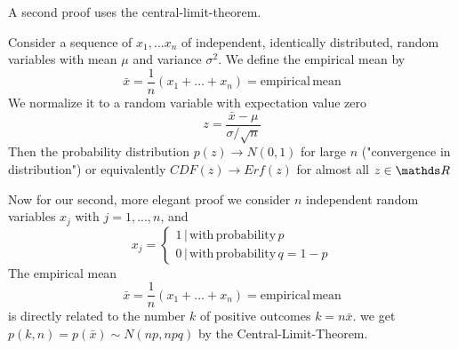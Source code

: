 \documentclass{/home/ben/Templates/notebook}
\begin{document}
	A second proof uses the central-limit-theorem.
	
	\begin{theorem}
		Consider a sequence of $x_1, ... x_n$ of independent, identically distributed, random variables with mean $\mu$ and variance $\sigma^2$. We define the empirical mean by
		\begin{equation}
		\bar{x} = \frac{1}{n}(x_1 + \dots + x_n) = \mathrm{empirical \, mean}
		\end{equation}
		We normalize it to a random variable with expectation value zero
		\begin{equation}
		z = \frac{\bar{x}-\mu}{\sigma/\sqrt{n}}
		\end{equation}
		Then the probability distribution $p(z) \to N(0,1)$ for large $n$ ("convergence in distribution") or equivalently $CDF(z) \to Erf(z)$ for almost all $z \in \R$	
	\end{theorem}
	
	Now for our second, more elegant proof we consider $n$ independent random variables $x_j$ with $j = 1,...,n$, and
	\begin{equation}
	x_j = \begin{cases} 1 \, | \, \mathrm{with \, probability \,} p \\ 0 \, | \, \mathrm{with \, probability \, } q = 1 - p \end{cases}
	\end{equation}
	The empirical mean
	\begin{equation}
	\bar{x} = \frac{1}{n}(x_1 + \dots + x_n) = \mathrm{empirical \, mean}
	\end{equation}
	is directly related to the number $k$ of positive outcomes $k = n\bar{x}$. we get $p(k,n) = p(\bar{x}) \sim N(np,npq)$ by the Central-Limit-Theorem. 
	
\end{document}
